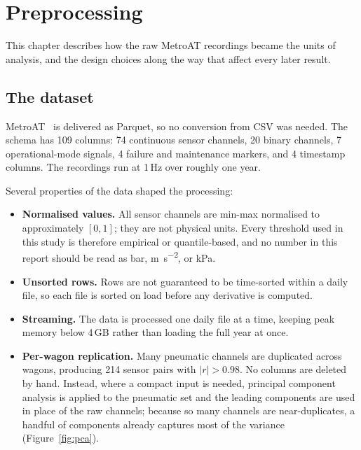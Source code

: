 \chapter{Preprocessing}
\label{ch:preprocessing}

This chapter describes how the raw MetroAT recordings became the units of analysis, and
the design choices along the way that affect every later result.

\section{The dataset}

MetroAT~\cite{MetroAT:2026} is delivered as Parquet, so no conversion from CSV was needed.
The schema has 109 columns: 74 continuous sensor channels, 20 binary channels, 7
operational-mode signals, 4 failure and maintenance markers, and 4 timestamp columns. The
recordings run at 1\,Hz over roughly one year.

Several properties of the data shaped the processing:

\begin{itemize}
  \item \textbf{Normalised values.} All sensor channels are min-max normalised to
        approximately $[0,1]$; they are not physical units. Every threshold used in this
        study is therefore empirical or quantile-based, and no number in this report should
        be read as bar, \si{\metre\per\second\squared}, or \si{\kilo\pascal}.
  \item \textbf{Unsorted rows.} Rows are not guaranteed to be time-sorted within a daily
        file, so each file is sorted on load before any derivative is computed.
  \item \textbf{Streaming.} The data is processed one daily file at a time, keeping peak
        memory below 4\,GB rather than loading the full year at once.
  \item \textbf{Per-wagon replication.} Many pneumatic channels are duplicated across
        wagons, producing 214 sensor pairs with $|r| > 0.98$. No columns are deleted by
        hand. Instead, where a compact input is needed, principal component analysis is
        applied to the pneumatic set and the leading components are used in place of the raw
        channels; because so many channels are near-duplicates, a handful of components
        already captures most of the variance (Figure~\ref{fig:pca}).
\end{itemize}


